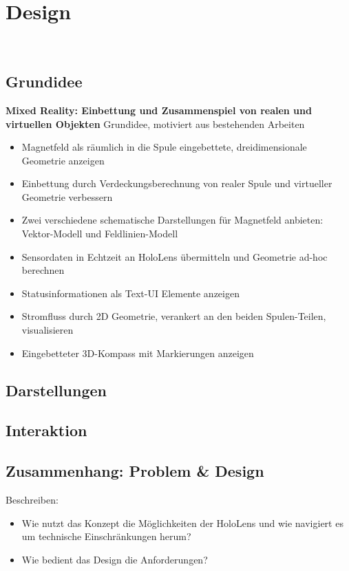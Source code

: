 \section{Design}
\label{sec-4}
\\

\subsection{Grundidee}
\textbf{Mixed Reality: Einbettung und Zusammenspiel von realen und virtuellen Objekten}
Grundidee, motiviert aus bestehenden Arbeiten\\

\begin{itemize}
	\item Magnetfeld als räumlich in die Spule eingebettete, dreidimensionale Geometrie anzeigen
	\item Einbettung durch Verdeckungsberechnung von realer Spule und virtueller Geometrie verbessern
	\item Zwei verschiedene schematische Darstellungen für Magnetfeld anbieten: Vektor-Modell und Feldlinien-Modell
	\item Sensordaten in Echtzeit an HoloLens übermitteln und Geometrie ad-hoc berechnen
	\item Statusinformationen als Text-UI Elemente anzeigen
	\item Stromfluss durch 2D Geometrie, verankert an den beiden Spulen-Teilen, visualisieren
	\item Eingebetteter 3D-Kompass mit Markierungen anzeigen
\end{itemize}

\subsection{Darstellungen}

\subsection{Interaktion}

\subsection{Zusammenhang: Problem \& Design}
Beschreiben: 
\begin{itemize}
	\item Wie nutzt das Konzept die Möglichkeiten der HoloLens und wie navigiert es um technische Einschränkungen herum?
	\item Wie bedient das Design die Anforderungen?
\end{itemize}

